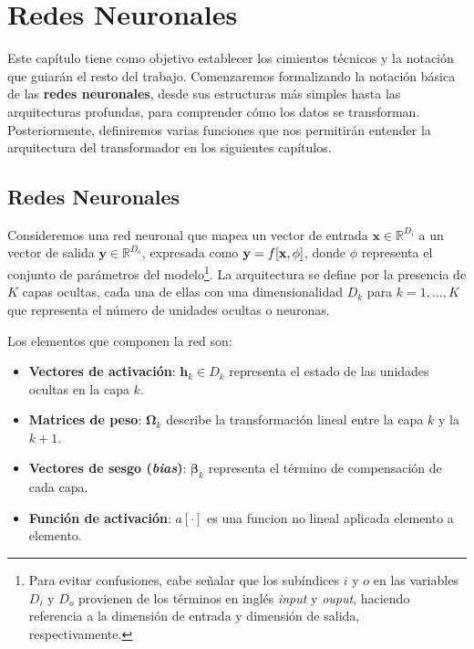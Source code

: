 \chapter{Redes Neuronales}
\label{cap:Redes Neuronales}

Este capítulo tiene como objetivo establecer los cimientos 
técnicos y la notación que guiarán el resto del trabajo. 
Comenzaremos formalizando la notación básica de las 
\textbf{redes neuronales}, desde sus estructuras más simples 
hasta las arquitecturas profundas, para comprender cómo los 
datos se transforman. Posteriormente, definiremos varias funciones
que nos permitirán entender la arquitectura del transformador en
los siguientes capítulos.
\section{Redes Neuronales}

Consideremos una red neuronal que mapea un vector de entrada
$\mathbf{x} \in \mathbb{R}^{D_i}$  %
 a un vector de salida 
$\mathbf{y} \in \mathbb{R}^{D_o}$, 
expresada como 
$ \mathbf{y} = f[\mathbf{x},\phi]$, 
donde $\phi$ representa el conjunto de parámetros del modelo\footnote{ Para evitar confusiones, cabe señalar que los 
subíndices $i$ y $o$ en las variables $D_i$ y $D_o$ provienen de 
los términos en inglés 
\textit{input} y \textit{ouput}, haciendo referencia a la 
dimensión de entrada y dimensión de salida, respectivamente.}. 
La arquitectura se define por la presencia de $K$ capas ocultas, 
cada una de ellas con una dimensionalidad $D_k$ para 
$k = 1,\dots, K$ 
que representa el número de unidades ocultas o neuronas.

Los elementos que componen la red son:
\begin{itemize}
    \item \textbf{Vectores de activación}: $\mathbf{h}_k \in D_k$ representa el estado de las unidades ocultas en la capa $k$.

    \item \textbf{Matrices de peso}: $\boldsymbol{\Omega}_k$ describe la transformación lineal entre la capa $k$ y la $k+1$.

    \item \textbf{Vectores de sesgo (\textit{bias})}: $\boldsymbol{\beta}_k$ representa el término de compensación de cada capa.

    \item  \textbf{Función de activación}: $a[\cdot]$ es una funcion no lineal aplicada elemento a elemento.
\end{itemize}



